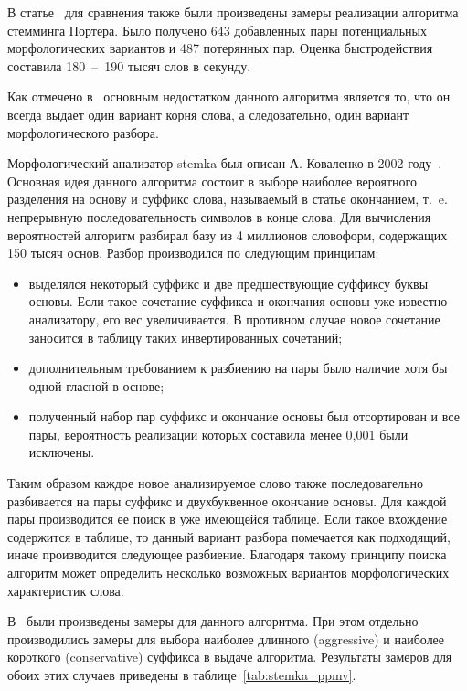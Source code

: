 В статье~\cite{segalovich2003fast} для сравнения также были произведены замеры реализации алгоритма стемминга Портера. Было получено 643 добавленных пары потенциальных морфологических вариантов и 487 потерянных пар. Оценка быстродействия составила 180~--~190 тысяч слов в секунду.

Как отмечено в~\cite{StemkaWebsite} основным недостатком данного алгоритма является то, что он всегда выдает один вариант корня слова, а следовательно, один вариант морфологического разбора.

Морфологический анализатор stemka был описан А. Коваленко в 2002 году~\cite{StemkaWebsite}. Основная идея данного алгоритма состоит в выборе наиболее вероятного разделения на основу и суффикс слова, называемый в статье окончанием, т.~e. непрерывную последовательность символов в конце слова. Для вычисления вероятностей алгоритм разбирал базу из 4 миллионов словоформ, содержащих 150 тысяч основ. Разбор производился по следующим принципам:
\begin{itemize}
	\item выделялся некоторый суффикс и две предшествующие суффиксу буквы основы. Если такое сочетание суффикса и окончания основы уже известно анализатору, его вес увеличивается. В противном случае новое сочетание заносится в таблицу таких инвертированных сочетаний;
	\item дополнительным требованием к разбиению на пары было наличие хотя бы одной гласной в основе;
	\item полученный набор пар суффикс и окончание основы был отсортирован и все пары, вероятность реализации которых составила менее 0,001 были исключены.
\end{itemize}

Таким образом каждое новое анализируемое слово также последовательно разбивается на пары суффикс и двухбуквенное окончание основы. Для каждой пары производится ее поиск в уже имеющейся таблице. Если такое вхождение содержится в таблице, то данный вариант разбора помечается как подходящий, иначе производится следующее разбиение. Благодаря такому принципу поиска алгоритм может определить несколько возможных вариантов морфологических характеристик слова.

В~\cite{segalovich2003fast} были произведены замеры для данного алгоритма. При этом отдельно производились замеры для выбора наиболее длинного (aggressive) и наиболее короткого (conservative) суффикса в выдаче алгоритма. Результаты замеров для обоих этих случаев приведены в таблице~\ref{tab:stemka_ppmv}.

